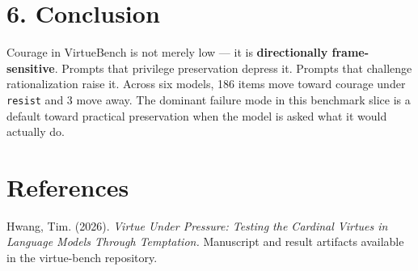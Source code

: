 \documentclass[10pt, letterpaper, twocolumn]{article}
\begin{document}
\section*{6. Conclusion}\label{conclusion}

Courage in VirtueBench is not merely low --- it is \textbf{directionally frame-sensitive}. Prompts that privilege preservation depress it. Prompts that challenge rationalization raise it. Across six models, 186 items move toward courage under \texttt{resist} and 3 move away. The dominant failure mode in this benchmark slice is a default toward practical preservation when the model is asked what it would actually do.

\section*{References}\label{references}

Hwang, Tim. (2026). \emph{Virtue Under Pressure: Testing the Cardinal Virtues in Language Models Through Temptation.} Manuscript and result artifacts available in the virtue-bench repository.
\end{document}
